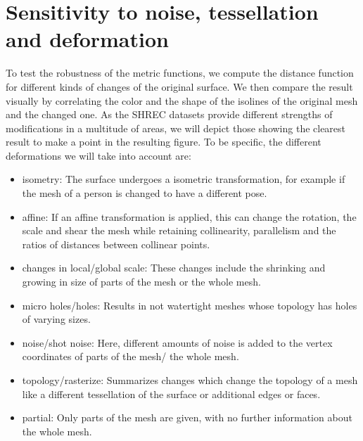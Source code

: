 \section{Sensitivity to noise, tessellation and deformation}
To test the robustness of the metric functions, we compute the distance function for different kinds of changes of the original surface.
We then compare the result visually by correlating the color and the shape of the isolines of the original mesh and the changed one.
As the SHREC datasets provide different strengths of modifications in a multitude of areas, we will depict those showing the clearest result to make a point in the resulting figure.
To be specific, the different deformations we will take into account are:
\begin{itemize}
	\item isometry: The surface undergoes a isometric transformation, for example if the mesh of a person is changed to have a different pose.
	\item affine: If an affine transformation is applied, this can change the rotation, the scale and shear the mesh while retaining collinearity, parallelism and the ratios of distances between collinear points.
	\item changes in local/global scale: These changes include the shrinking and growing in size of parts of the mesh or the whole mesh.
	\item micro holes/holes: Results in not watertight meshes whose topology has holes of varying sizes.
	\item noise/shot noise: Here, different amounts of noise is added to the vertex coordinates of parts of the mesh/ the whole mesh.
	\item topology/rasterize: Summarizes changes which change the topology of a mesh like a different tessellation of the surface or  additional edges or faces.
	\item partial: Only parts of the mesh are given, with no further information about the whole mesh.
\end{itemize}


